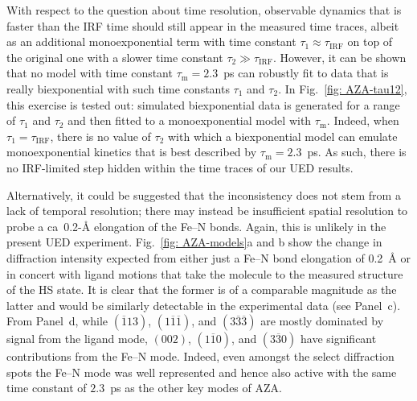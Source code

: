 With respect to the question about time resolution,
observable dynamics that is faster than the IRF time should still appear
in the measured time traces, albeit as an additional monoexponential term
with time constant $\tau_1 \approx \tau_\text{IRF}$ on top of
the original one with a slower time constant $\tau_2 \gg \tau_\text{IRF}$.
%
However, it can be shown that no model with time constant $\tau_\text{m} = 2.3$~ps
can robustly fit to data that is really biexponential with such time constants $\tau_1$
and $\tau_2$.
%
In Fig.~\ref{fig: AZA-tau12}, this exercise is tested out:
simulated biexponential data is generated for a range of $\tau_1$ and $\tau_2$
and then fitted to a monoexponential model with $\tau_\text{m}$.
%
Indeed, when $\tau_1 = \tau_\text{IRF}$,
there is no value of $\tau_2$ with which a biexponential model can emulate
monoexponential kinetics that is best described by $\tau_\text{m} = 2.3$~ps.
%
As such, there is no IRF-limited step hidden within the time traces of
our UED results.

Alternatively, it could be suggested that the inconsistency does not stem
from a lack of temporal resolution; there may instead be insufficient spatial resolution
to probe a ca~0.2-\AA{} elongation of the Fe--N bonds.
%
Again, this is unlikely in the present UED experiment.
%
Fig.~\ref{fig: AZA-models}a and b show the change in diffraction intensity
expected from either just a Fe--N bond elongation of 0.2~\AA{} or
in concert with ligand motions that take the molecule to the measured structure of the HS state.
%
It is clear that the former is of a comparable magnitude as the latter
and would be similarly detectable in the experimental data (see Panel~c).
%
From Panel~d, while $(\overline{1} 1 3)$, $(1 \overline{1} \overline{1})$,
and $(3 \overline{3} \overline{3})$ are mostly dominated by signal from the ligand mode,
$(0 0 2)$,  $(1 \overline{1} 0)$, and $(3 \overline{3} 0)$ have significant contributions
from the Fe--N mode.
%
Indeed, even amongst the select diffraction spots
the Fe--N mode was well represented and hence also active with the same time constant of $2.3$~ps
as the other key modes of AZA.

